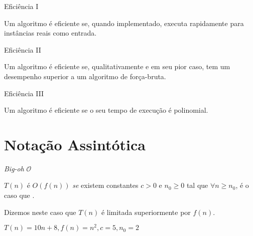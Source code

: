 \documentclass[
    mode=present,
    style=dvn,
    paper=screen,
    display=slidesnotes,
    size=14pt,
]{powerdot}
\begin{document}
\begin{slide}{Eficiência I}
    \Large
    \begin{defn}
        Um algoritmo é eficiente se, quando implementado, executa rapidamente para instâncias reais como entrada.
    \end{defn}
\end{slide}

\begin{slide}{Eficiência II}
    \Large
    \begin{defn}
        Um algoritmo é eficiente se, qualitativamente e em seu pior caso, tem um desempenho superior a um algoritmo de força-bruta.
    \end{defn}
\end{slide}

\begin{slide}{Eficiência III}
    \Large
    \begin{defn}
        Um algoritmo é eficiente se o seu tempo de execução é polinomial.\pause
    \end{defn}
\end{slide}

\section{Notação Assintótica}

\begin{slide}{\textit{Big-oh} $\mathcal{O}$}
    \begin{defn}
         $T(n)$ é $O(f(n))$ \textit{se} existem constantes $c>0$ e $n_0 \geq 0$ tal que $\forall n \geq n_0$, é o caso que .\pause
    \end{defn}
    Dizemos neste caso que $T(n)$ é limitada superiormente por $f(n)$.
    \bigskip
    \begin{tcolorbox}[title=Exemplo]
        $T(n) = 10n + 8, f(n)=n^2, c = 5, n_0 = 2$ 
    \end{tcolorbox}
\end{slide}
\end{document}
